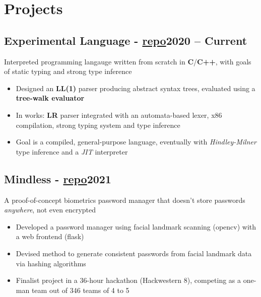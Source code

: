 \documentclass[9pt]{article}
\begin{document}

\section*{Projects}

\subsection{Experimental Language \normalsize\textnormal{- \href{https://github.com/ianayl/ex-interpreter}{repo}}\hfill \normalsize\textnormal{2020 -- Current}}
Interpreted programming langauge written from scratch in \textbf{C}/\textbf{C++}, with goals of static typing and strong type inference
\vspace{-0.5em}
\begin{itemize}
  \item Designed an \textbf{LL(1)} parser producing abstract syntax trees, evaluated using a \textbf{tree-walk evaluator}
    \item In works: \textbf{LR} parser integrated with an automata-based lexer, x86 compilation, strong typing system and type inference
    \item Goal is a compiled, general-purpose language, eventually with \textit{Hindley-Milner} type inference and a \textit{JIT} interpreter 
\end{itemize}

\subsection{Mindless \normalsize\textnormal{- \href{https://github.com/ianayl/mindless}{repo}}\hfill \normalsize\textnormal{2021}}
    A proof-of-concept biometrics password manager that doesn't store passwords \textit{anywhere}, not even encrypted
\vspace{-0.5em}
\begin{itemize}
    \item Developed a password manager using facial landmark scanning (opencv) with a web frontend (flask)
    \item Devised method to generate consistent passwords from facial landmark data via hashing algorithms
    \item Finalist project in a 36-hour hackathon (Hackwestern 8), competing as a one-man team out of 346 teams of 4 to 5
\end{itemize}
\end{document}
